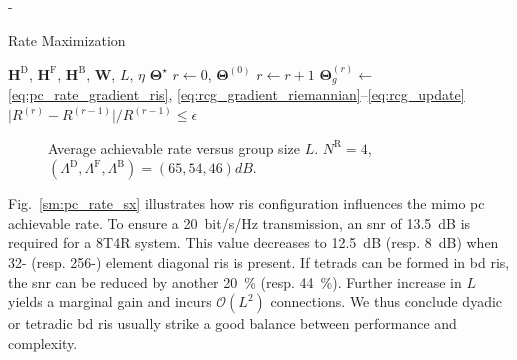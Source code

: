\documentclass[journal]{IEEEtran}
\makeatletter
\newcommand\setalgorithmcaptionfont[1]{%
	\let\my@floatc@ruled\floatc@ruled          %
	\def\floatc@ruled{%
		\global\let\floatc@ruled\my@floatc@ruled %
		#1\floatc@ruled}}
\makeatother
\begin{document}
\begin{section}{-}
\begin{subsection}{Rate Maximization}
		\setalgorithmcaptionfont{\small}
		\begin{algorithm}[!t]
			\small
			\caption{\gls{rcg} Method for \gls{ris} \gls{mimo}-\gls{pc} Rate Maximization}
			\label{ag:pc_rate_ris}
			\begin{algorithmic}[1]
				\Require $\mathbf{H}^\mathrm{D}$, $\mathbf{H}^\mathrm{F}$, $\mathbf{H}^\mathrm{B}$, $\mathbf{W}$, $L$, $\eta$
				\Ensure $\mathbf{\Theta}^\star$
				\State $r \gets 0$, $\mathbf{\Theta}^{(0)}$
				\Repeat
					\State $r \gets r+1$
						\State $\mathbf{\Theta}_g^{(r)} \gets$ \eqref{eq:pc_rate_gradient_ris}, \eqref{eq:rcg_gradient_riemannian}--\eqref{eq:rcg_update}
					\EndFor
				\Until $\lvert R^{(r)} - R^{(r-1)} \rvert / R^{(r-1)} \le \epsilon$
			\end{algorithmic}
		\end{algorithm}

		\begin{figure}[!t]
			\centering
			\subfloat[\gls{ris} Elements, $N^\mathrm{T} = 8$\label{sm:pc_rate_sx}]{
				\resizebox{0.48\columnwidth}{!}{
					
				}
			}
			\subfloat[Transmit Antenna, $N^\mathrm{S} = 256$\label{sm:pc_rate_tx}]{
				\resizebox{0.48\columnwidth}{!}{
					
				}
			}
			\caption{Average achievable rate versus group size $L$. $N^\mathrm{R} = 4$, $(\Lambda^\mathrm{D}, \Lambda^\mathrm{F}, \Lambda^\mathrm{B}) = (65, 54, 46) \unit{dB}$.}
			\label{sm:pc_rate}
		\end{figure}

		Fig.~\ref{sm:pc_rate_sx} illustrates how \gls{ris} configuration influences the \gls{mimo} \gls{pc} achievable rate.
		To ensure a \qty{20}{bit/s/Hz} transmission, an \gls{snr} of \qty{13.5}{\dB} is required for a 8T4R system.
		This value decreases to \qty{12.5}{\dB} (resp. \qty{8}{\dB}) when 32- (resp. 256-) element diagonal \gls{ris} is present.
		If tetrads can be formed in \gls{bd} \gls{ris}, the \gls{snr} can be reduced by another \qty{20}{\percent} (resp. \qty{44}{\percent}).
		Further increase in $L$ yields a marginal gain and incurs $\mathcal{O}(L^2)$ connections.
		We thus conclude dyadic or tetradic \gls{bd} \gls{ris} usually strike a good balance between performance and complexity.
	\end{subsection}

\end{section}
\end{document}
